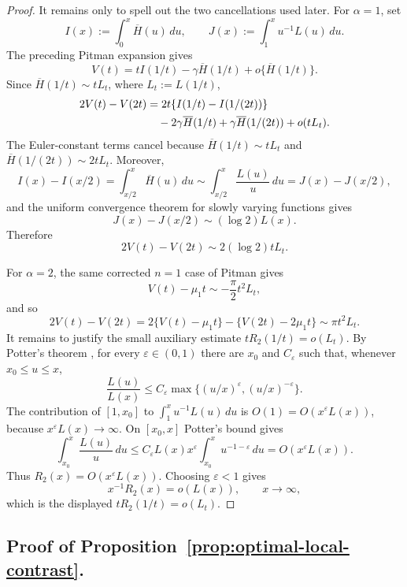 \documentclass[aap,press]{apt} \volno{00} \partno{00}
\newcommand{\1}{\mathbf{1}}
\numberwithin{equation}{section}
\begin{document}
\begin{proof}
It remains only to spell out the two cancellations used later. For $\alpha=1$, set
\[
I(x):=\int_0^x\overline H(u)\,du,
\qquad
J(x):=\int_1^x u^{-1}L(u)\,du.
\]
The preceding Pitman expansion gives
\[
V(t)=tI(1/t)-\gamma\overline H(1/t)+o\{\overline H(1/t)\}.
\]
Since $\overline H(1/t)\sim tL_t$, where $L_t:=L(1/t)$,
\begin{align*}
2V(t)-V(2t)
&=2t\{I(1/t)-I(1/(2t))\}\notag\\
&\quad -2\gamma\overline H(1/t)+\gamma\overline H(1/(2t))+o(tL_t).
\end{align*}
The Euler-constant terms cancel because $\overline H(1/t)\sim tL_t$ and $\overline H(1/(2t))\sim2tL_t$. Moreover,
\[
I(x)-I(x/2)
=\int_{x/2}^x\overline H(u)\,du
\sim \int_{x/2}^x\frac{L(u)}{u}\,du
=J(x)-J(x/2),
\]
and the uniform convergence theorem for slowly varying functions \cite[Theorem~1.2.1]{Bingham_Goldie_Teugels_1987} gives
\[
J(x)-J(x/2)\sim(\log2)L(x).
\]
Therefore
\[
2V(t)-V(2t)\sim 2(\log2)tL_t.
\]

For $\alpha=2$, the same corrected $n=1$ case of Pitman \cite[Theorem~8(i)]{Pitman1968} gives
\[
V(t)-\mu_1t\sim -\frac{\pi}{2}t^2L_t,
\]
and so
\[
2V(t)-V(2t)
=2\{V(t)-\mu_1t\}-\{V(2t)-2\mu_1t\}
\sim \pi t^2L_t.
\]
It remains to justify the small auxiliary estimate $tR_2(1/t)=o(L_t)$. By Potter's theorem \cite[Theorem~1.5.6(i)]{Bingham_Goldie_Teugels_1987}, for every $\varepsilon\in(0,1)$ there are $x_0$ and $C_\varepsilon$ such that, whenever $x_0\le u\le x$,
\[
\frac{L(u)}{L(x)}\le C_\varepsilon\max\{(u/x)^\varepsilon,(u/x)^{-\varepsilon}\}.
\]
The contribution of $[1,x_0]$ to $\int_1^x u^{-1}L(u)\,du$ is $O(1)=O(x^\varepsilon L(x))$, because $x^\varepsilon L(x)\to\infty$. On $[x_0,x]$ Potter's bound gives
\[
\int_{x_0}^x \frac{L(u)}u\,du
\le
C_\varepsilon L(x)x^\varepsilon\int_{x_0}^x u^{-1-\varepsilon}\,du
=
O(x^\varepsilon L(x)).
\]
Thus $R_2(x)=O(x^\varepsilon L(x))$. Choosing $\varepsilon<1$ gives
\[
x^{-1}R_2(x)=o(L(x)),\qquad x\to\infty,
\]
which is the displayed $tR_2(1/t)=o(L_t)$.
\end{proof}

\subsection{Proof of Proposition~\ref{prop:optimal-local-contrast}.}
\end{document}
